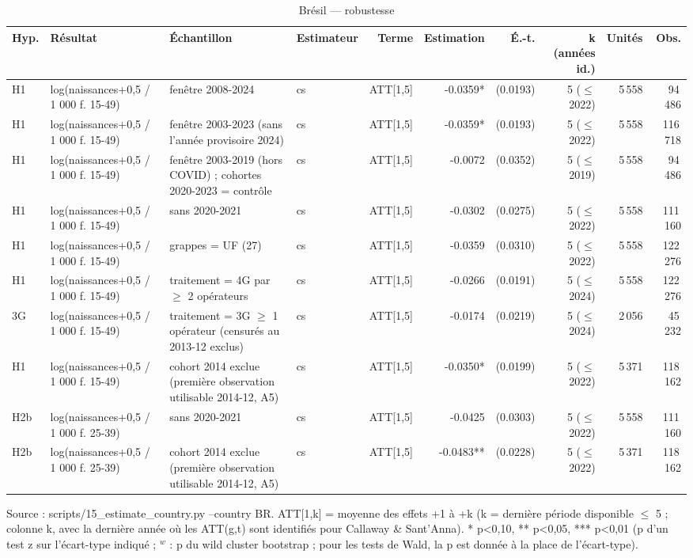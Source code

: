 \begin{table}\centering
\begin{threeparttable}
\caption{Brésil — robustesse}\label{tab:br_robust}
\scriptsize
\begin{tabular}{lp{5.4cm}p{7.2cm}lrrrrrr}
\toprule
Hyp. & Résultat & Échantillon & Estimateur & Terme & Estimation & É.-t. & k (années id.) & Unités & Obs. \\
\midrule
H1 & log(naissances+0,5 / 1 000 f. 15-49) & fenêtre 2008-2024 & cs & ATT[1,5] & -0.0359* & (0.0193) & 5 ($\leq$ 2022) & 5\,558 & 94\,486 \\
H1 & log(naissances+0,5 / 1 000 f. 15-49) & fenêtre 2003-2023 (sans l'année provisoire 2024) & cs & ATT[1,5] & -0.0359* & (0.0193) & 5 ($\leq$ 2022) & 5\,558 & 116\,718 \\
H1 & log(naissances+0,5 / 1 000 f. 15-49) & fenêtre 2003-2019 (hors COVID) ; cohortes 2020-2023 = contrôle & cs & ATT[1,5] & -0.0072 & (0.0352) & 5 ($\leq$ 2019) & 5\,558 & 94\,486 \\
H1 & log(naissances+0,5 / 1 000 f. 15-49) & sans 2020-2021 & cs & ATT[1,5] & -0.0302 & (0.0275) & 5 ($\leq$ 2022) & 5\,558 & 111\,160 \\
H1 & log(naissances+0,5 / 1 000 f. 15-49) & grappes = UF (27) & cs & ATT[1,5] & -0.0359 & (0.0310) & 5 ($\leq$ 2022) & 5\,558 & 122\,276 \\
H1 & log(naissances+0,5 / 1 000 f. 15-49) & traitement = 4G par $\geq$ 2 opérateurs & cs & ATT[1,5] & -0.0266 & (0.0191) & 5 ($\leq$ 2024) & 5\,558 & 122\,276 \\
3G & log(naissances+0,5 / 1 000 f. 15-49) & traitement = 3G $\geq$ 1 opérateur (censurés au 2013-12 exclus) & cs & ATT[1,5] & -0.0174 & (0.0219) & 5 ($\leq$ 2024) & 2\,056 & 45\,232 \\
H1 & log(naissances+0,5 / 1 000 f. 15-49) & cohort 2014 exclue (première observation utilisable 2014-12, A5) & cs & ATT[1,5] & -0.0350* & (0.0199) & 5 ($\leq$ 2022) & 5\,371 & 118\,162 \\
H2b & log(naissances+0,5 / 1 000 f. 25-39) & sans 2020-2021 & cs & ATT[1,5] & -0.0425 & (0.0303) & 5 ($\leq$ 2022) & 5\,558 & 111\,160 \\
H2b & log(naissances+0,5 / 1 000 f. 25-39) & cohort 2014 exclue (première observation utilisable 2014-12, A5) & cs & ATT[1,5] & -0.0483** & (0.0228) & 5 ($\leq$ 2022) & 5\,371 & 118\,162 \\
\bottomrule
\end{tabular}
\begin{tablenotes}\footnotesize
\item Source : scripts/15\_estimate\_country.py --country BR. ATT[1,k] = moyenne des effets +1 à +k (k = dernière période disponible $\leq$ 5 ; colonne k, avec la dernière année où les ATT(g,t) sont identifiés pour Callaway \& Sant'Anna). * p<0,10, ** p<0,05, *** p<0,01 (p d'un test z sur l'écart-type indiqué ; $^{w}$ : p du wild cluster bootstrap ; pour les tests de Wald, la p est donnée à la place de l'écart-type).
\end{tablenotes}
\end{threeparttable}
\end{table}
